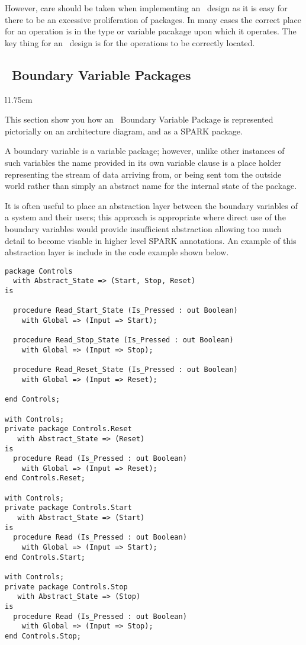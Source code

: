 However, care should be taken when implementing an \informed\ design
as it is easy for there to be an excessive proliferation of
packages. In many cases the correct place for an operation is in the
type or variable pacakage upon which it operates. The key thing for an
\informed\ design is for the operations to be correctly located.

\subsection{\informed\ Boundary Variable Packages}
\begin{wrapfigure}{l}{1.75cm}
\end{wrapfigure}

This section show you how an \informed\ Boundary Variable Package is
represented pictorially on an architecture diagram, and as a SPARK
package.

A boundary variable is a variable package; however, unlike other
instances of such variables the name provided in its own variable
clause is a place holder representing the stream of data arriving
from, or being sent tom the outside world rather than simply an
abstract name for the internal state of the package.

It is often useful to place an abstraction layer between the boundary
variables of a system and their users; this approach is appropriate
where direct use of the boundary variables would provide insufficient
abstraction allowing too much detail to become visable in higher level
SPARK annotations. An example of this abstraction layer is include in
the code example shown below.

\begin{lstlisting}[caption=An \informed\ SPARK Boundary Variable Package]
package Controls
  with Abstract_State => (Start, Stop, Reset)
is

  procedure Read_Start_State (Is_Pressed : out Boolean)
    with Global => (Input => Start);

  procedure Read_Stop_State (Is_Pressed : out Boolean)
    with Global => (Input => Stop);

  procedure Read_Reset_State (Is_Pressed : out Boolean)
    with Global => (Input => Reset);

end Controls;

with Controls;
private package Controls.Reset
   with Abstract_State => (Reset)
is
  procedure Read (Is_Pressed : out Boolean)
    with Global => (Input => Reset);
end Controls.Reset;

with Controls;
private package Controls.Start
   with Abstract_State => (Start)
is
  procedure Read (Is_Pressed : out Boolean)
    with Global => (Input => Start);
end Controls.Start;

with Controls;
private package Controls.Stop
   with Abstract_State => (Stop)
is
  procedure Read (Is_Pressed : out Boolean)
    with Global => (Input => Stop);
end Controls.Stop;

\end{lstlisting}


